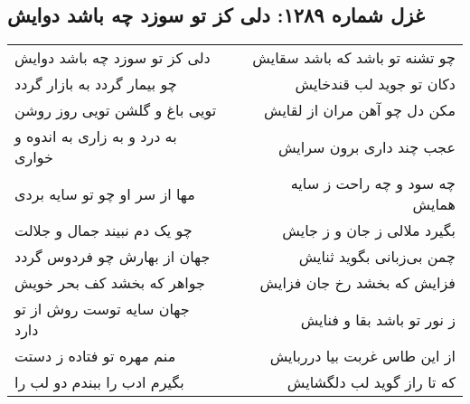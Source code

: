 \begin{center}
\section*{غزل شماره ۱۲۸۹: دلی کز تو سوزد چه باشد دوایش}
\label{sec:1289}
\begin{longtable}{l p{0.5cm} r}
دلی کز تو سوزد چه باشد دوایش
&&
چو تشنه تو باشد که باشد سقایش
\\
چو بیمار گردد به بازار گردد
&&
دکان تو جوید لب قندخایش
\\
تویی باغ و گلشن تویی روز روشن
&&
مکن دل چو آهن مران از لقایش
\\
به درد و به زاری به اندوه و خواری
&&
عجب چند داری برون سرایش
\\
مها از سر او چو تو سایه بردی
&&
چه سود و چه راحت ز سایه همایش
\\
چو یک دم نبیند جمال و جلالت
&&
بگیرد ملالی ز جان و ز جایش
\\
جهان از بهارش چو فردوس گردد
&&
چمن بی‌زبانی بگوید ثنایش
\\
جواهر که بخشد کف بحر خویش
&&
فزایش که بخشد رخ جان فزایش
\\
جهان سایه توست روش از تو دارد
&&
ز نور تو باشد بقا و فنایش
\\
منم مهره تو فتاده ز دستت
&&
از این طاس غربت بیا درربایش
\\
بگیرم ادب را ببندم دو لب را
&&
که تا راز گوید لب دلگشایش
\\
\end{longtable}
\end{center}
